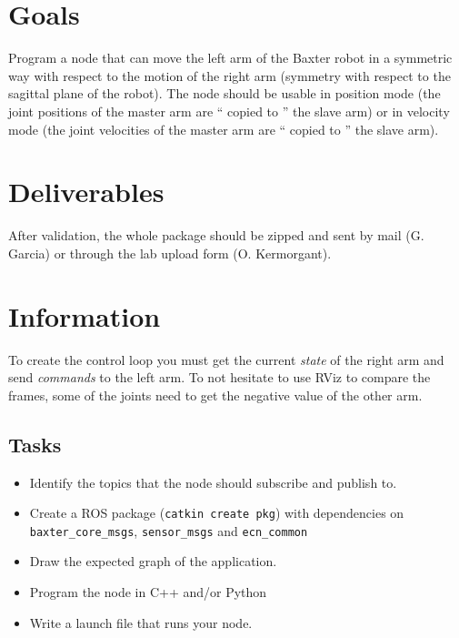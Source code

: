 \documentclass{ecnreport}
\author{G. Garcia, O. Kermorgant}
\begin{document}


\section{Goals}

Program a node that can move the left arm of the Baxter robot in a symmetric way with respect to
the motion of the right arm (symmetry with respect to the sagittal plane of the robot).
The node should be usable in position mode (the joint positions of the master arm are `` copied to ''
the slave arm) or in velocity mode (the joint velocities of the master arm are `` copied to '' the slave
arm).

\section{Deliverables}

After validation, the whole package should be zipped and sent by mail (G. Garcia) or through the lab upload form (O. Kermorgant).

\section{Information}

To create the control loop you must get the current \emph{state} of the right arm and send \emph{commands} to 
the left arm. To not hesitate to use RViz to compare the frames, some of the joints need to get the negative
value of the other arm.

\subsection{Tasks}

\begin{itemize}
\item Identify the topics that the node should subscribe and publish to.
 \item Create a ROS package (\texttt{catkin create pkg}) with dependencies on \texttt{baxter\_core\_msgs}, 
 \texttt{sensor\_msgs} and \texttt{ecn\_common}
 \item Draw the expected graph of the application. 
 \item Program the node in C++ and/or Python
 \item Write a launch file that runs your node. 
 \end{itemize}
 
\end{document}
